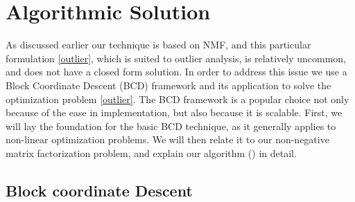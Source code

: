 \section{Algorithmic Solution}
\label{sec:algorithm}

As discussed earlier our technique is based on NMF, and
this particular formulation \eqref{outlier}, which is
suited to outlier analysis, is relatively uncommon, and  does not
have a closed form solution. In order to address this issue we use a
Block Coordinate Descent (BCD) framework and its application to
solve the optimization problem \eqref{outlier}. The BCD framework is
a popular choice not only because of the ease in implementation,
but also because it is scalable. First, we will lay the foundation
for the basic BCD technique, as it generally applies to non-linear
optimization problems. We will then relate it to our non-negative
matrix factorization problem, and explain our algorithm \algofull
(\algo) in detail.

\subsection{Block coordinate Descent}

